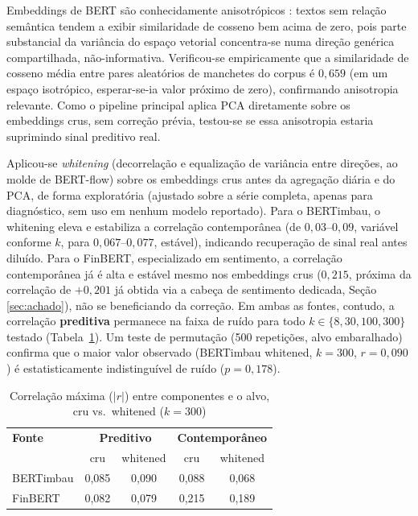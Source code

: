 \documentclass[conference]{IEEEtran}
\begin{document}
Embeddings de BERT s\~ao conhecidamente anisotr\'opicos \cite{ethayarajh2019}: textos sem rela\c{c}\~ao sem\^antica tendem a exibir similaridade de cosseno bem acima de zero, pois parte substancial da vari\^ancia do espa\c{c}o vetorial concentra-se numa dire\c{c}\~ao gen\'erica compartilhada, n\~ao-informativa. Verificou-se empiricamente que a similaridade de cosseno m\'edia entre pares aleat\'orios de manchetes do corpus \'e $0{,}659$ (em um espa\c{c}o isotr\'opico, esperar-se-ia valor pr\'oximo de zero), confirmando anisotropia relevante. Como o pipeline principal aplica PCA diretamente sobre os embeddings crus, sem corre\c{c}\~ao pr\'evia, testou-se se essa anisotropia estaria suprimindo sinal preditivo real.

Aplicou-se \emph{whitening} (decorrela\c{c}\~ao e equaliza\c{c}\~ao de vari\^ancia entre dire\c{c}\~oes, ao molde de BERT-flow) sobre os embeddings crus antes da agrega\c{c}\~ao di\'aria e do PCA, de forma explorat\'oria (ajustado sobre a s\'erie completa, apenas para diagn\'ostico, sem uso em nenhum modelo reportado). Para o BERTimbau, o whitening eleva e estabiliza a correla\c{c}\~ao contempor\^anea (de $0{,}03$--$0{,}09$, vari\'avel conforme $k$, para $0{,}067$--$0{,}077$, est\'avel), indicando recupera\c{c}\~ao de sinal real antes diluído. Para o FinBERT, especializado em sentimento, a correla\c{c}\~ao contempor\^anea j\'a \'e alta e est\'avel mesmo nos embeddings crus ($0{,}215$, pr\'oxima da correla\c{c}\~ao de $+0{,}201$ j\'a obtida via a cabe\c{c}a de sentimento dedicada, Se\c{c}\~ao \ref{sec:achado}), n\~ao se beneficiando da corre\c{c}\~ao. Em ambas as fontes, contudo, a correla\c{c}\~ao \textbf{preditiva} permanece na faixa de ru\'ido para todo $k\in\{8,30,100,300\}$ testado (Tabela~\ref{tab:anisotropia}). Um teste de permuta\c{c}\~ao (500 repeti\c{c}\~oes, alvo embaralhado) confirma que o maior valor observado (BERTimbau whitened, $k=300$, $r=0{,}090$) \'e estatisticamente indistingu\'ivel de ru\'ido ($p=0{,}178$).

\begin{table}[htbp]
\caption{Correla\c{c}\~ao m\'axima ($|r|$) entre componentes e o alvo, cru vs.\ whitened ($k=300$)}
\begin{center}
\begin{tabular}{lcccc}
\toprule
\textbf{Fonte} & \multicolumn{2}{c}{\textbf{Preditivo}} & \multicolumn{2}{c}{\textbf{Contempor\^aneo}} \\
 & cru & whitened & cru & whitened \\
\midrule
BERTimbau & 0,085 & 0,090 & 0,088 & 0,068 \\
FinBERT   & 0,082 & 0,079 & 0,215 & 0,189 \\
\bottomrule
\end{tabular}
\label{tab:anisotropia}
\end{center}
\end{table}
\end{document}
